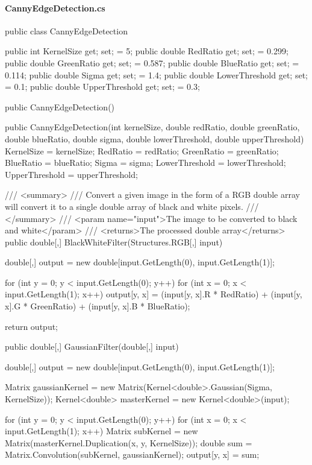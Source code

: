 \begin{flushleft}
    
    \paragraph{CannyEdgeDetection.cs}
    \begin{cscode}
public class CannyEdgeDetection
{
    public int KernelSize { get; set; } = 5;
    public double RedRatio { get; set; } = 0.299;
    public double GreenRatio { get; set; } = 0.587;
    public double BlueRatio { get; set; } = 0.114;
    public double Sigma { get; set; } = 1.4;
    public double LowerThreshold { get; set; } = 0.1;
    public double UpperThreshold { get; set; } = 0.3;

    public CannyEdgeDetection() { }

    public CannyEdgeDetection(int kernelSize, double redRatio, double greenRatio, double blueRatio, double sigma, double lowerThreshold, double upperThreshold)
    {
        KernelSize = kernelSize;
        RedRatio = redRatio;
        GreenRatio = greenRatio;
        BlueRatio = blueRatio;
        Sigma = sigma;
        LowerThreshold = lowerThreshold;
        UpperThreshold = upperThreshold;
    }

    /// <summary>
    /// Convert a given image in the form of a RGB double array will convert it to a single double array of black and white pixels.
    /// </summary>
    /// <param name="input">The image to be converted to black and white</param>
    /// <returns>The processed double array</returns>
    public double[,] BlackWhiteFilter(Structures.RGB[,] input)
    {
        double[,] output = new double[input.GetLength(0), input.GetLength(1)];

        for (int y = 0; y < input.GetLength(0); y++)
        {
            for (int x = 0; x < input.GetLength(1); x++)
            {
                output[y, x] = (input[y, x].R * RedRatio) + (input[y, x].G * GreenRatio) + (input[y, x].B * BlueRatio);
            }
        }

        return output;
    }

    public double[,] GaussianFilter(double[,] input)
    {
        double[,] output = new double[input.GetLength(0), input.GetLength(1)];

        Matrix gaussianKernel = new Matrix(Kernel<double>.Gaussian(Sigma, KernelSize));
        Kernel<double> masterKernel = new Kernel<double>(input);

        for (int y = 0; y < input.GetLength(0); y++)
        {
            for (int x = 0; x < input.GetLength(1); x++)
            {
                Matrix subKernel = new Matrix(masterKernel.Duplication(x, y, KernelSize));
                double sum = Matrix.Convolution(subKernel, gaussianKernel);
                output[y, x] = sum;
            }
        }

}}
\end{cscode}
\end{flushleft}
